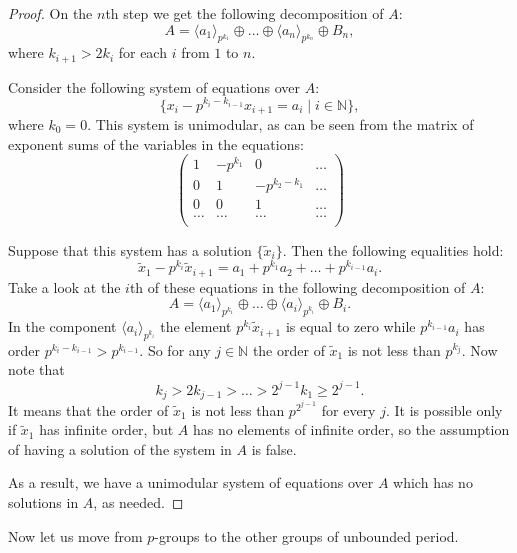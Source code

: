 \documentclass{article}
\theoremstyle{definition}
\theoremstyle{remark}
\let\tilde\widetilde
\begin{document}
\begin{proof}
On the $n$th step we get the following decomposition of $A$:
$$
A = \langle a_1 \rangle_{p^{k_1}} \oplus \ldots \oplus \langle a_n \rangle_{p^{k_n}} \oplus B_n,
$$
where $k_{i+1} > 2 k_{i}$
for each $i$ from $1$ to $n$.

Consider the following system of equations over $A$:
$$
\{x_i -p^{k_{i} - k_{i-1}}x_{i+1} = a_i \mid i \in \mathbb N \},
$$
where $k_0=0$.
This system is unimodular, as can be seen from the matrix
of exponent sums of the variables in the equations:
$$
\begin{pmatrix}
1 & -p^{k_1} & 0 & \dots \\
0 & 1 & -p^{k_2-k_1} & \dots \\
0 & 0 & 1 & \dots \\
\dots & \dots & \dots & \dots \\
\end{pmatrix}
$$

Suppose that this system has a solution $\{\tilde x_i\}$.
Then the following equalities hold:
$$
\tilde x_1 - p^{k_i}\tilde x_{i+1}= a_1 + p^{k_1}a_2 + \ldots+ p^{k_{i-1}}a_{i}.
$$
Take a look at the $i$th of these equations in the following decomposition of $A$:
$$
A = \langle a_1 \rangle_{p^{k_1}} \oplus \ldots \oplus \langle a_i \rangle_{p^{k_i}} \oplus B_i.
$$
In the component $\langle a_i \rangle_{p^{k_i}}$ the element $p^{k_i}\tilde x_{i+1}$
is equal to zero while $p^{k_{i-1}}a_{i}$ has order
$p^{k_i - k_{i-1}} > p^{k_{i-1}}$.
So for any $j \in \mathbb N$ the order of $\tilde x_1$
is not less than $p^{k_j}$.
Now note that
$$
k_j > 2k_{j-1} > \ldots > 2^{j-1}k_1 \geqslant 2^{j-1}.
$$
It means that the order of $\tilde x_1$ is not less than $p^{2^{j-1}}$ for every $j$.
It is possible only if $\tilde x_1$ has infinite order,
but $A$ has no elements of infinite order, so
the assumption of having a solution of the system in $A$
is false.

As a result, we have a unimodular system of equations
over $A$ which has no solutions in $A$, as needed.
\end{proof}

Now let us move from $p$-groups to the
other groups of unbounded period.
\end{document}
